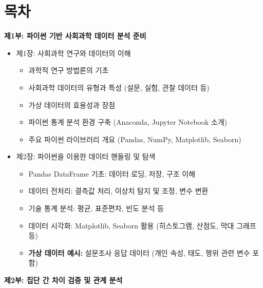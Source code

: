 \documentclass[
  letterpaper,
]{book}
\providecommand{\tightlist}{%
  \setlength{\itemsep}{0pt}\setlength{\parskip}{0pt}}
\begin{document}
\chapter*{목차}\label{uxbaa9uxcc28}


\textbf{제1부: 파이썬 기반 사회과학 데이터 분석 준비}

\begin{itemize}
\tightlist
\item
  제1장: 사회과학 연구와 데이터의 이해

  \begin{itemize}
  \tightlist
  \item
    과학적 연구 방법론의 기초
  \item
    사회과학 데이터의 유형과 특성 (설문, 실험, 관찰 데이터 등)
  \item
    가상 데이터의 효용성과 장점
  \item
    파이썬 통계 분석 환경 구축 (Anaconda, Jupyter Notebook 소개)
  \item
    주요 파이썬 라이브러리 개요 (Pandas, NumPy, Matplotlib, Seaborn)
  \end{itemize}
\item
  제2장: 파이썬을 이용한 데이터 핸들링 및 탐색

  \begin{itemize}
  \tightlist
  \item
    Pandas DataFrame 기초: 데이터 로딩, 저장, 구조 이해
  \item
    데이터 전처리: 결측값 처리, 이상치 탐지 및 조정, 변수 변환
  \item
    기술 통계 분석: 평균, 표준편차, 빈도 분석 등
  \item
    데이터 시각화: Matplotlib, Seaborn 활용 (히스토그램, 산점도, 막대
    그래프 등)
  \item
    \textbf{가상 데이터 예시:} 설문조사 응답 데이터 (개인 속성, 태도,
    행위 관련 변수 포함)
  \end{itemize}
\end{itemize}

\textbf{제2부: 집단 간 차이 검증 및 관계 분석}
\end{document}
